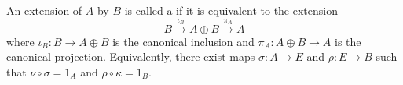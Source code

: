 An extension of $A$ by $B$ is called a  if it is equivalent to the extension
$$
B \xrightarrow{\iota_B} A \oplus B \xrightarrow{\pi_A} A
$$
where $\iota_B: B \to A \oplus B$ is the canonical inclusion and $\pi_A: A \oplus B \to A$ is the canonical projection. Equivalently, there exist maps $\sigma: A \to E$ and $\rho: E \to B$ such that $\nu \circ \sigma = 1_A$ and $\rho \circ \kappa = 1_B$.
